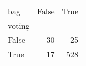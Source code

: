 \begin{tabular}{lrr}
\toprule
bag &  False &  True  \\
voting &        &        \\
\midrule
False  &     30 &     25 \\
True   &     17 &    528 \\
\bottomrule
\end{tabular}
